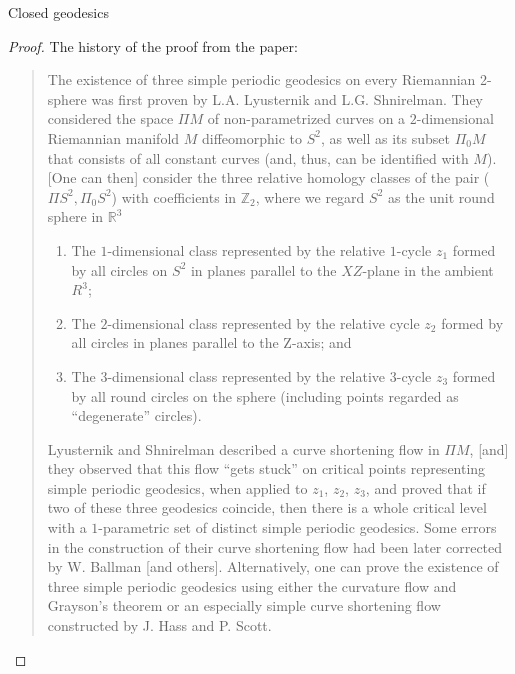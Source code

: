 \documentclass{article}
\theoremstyle{definition}
\theoremstyle{remark}
\begin{document}
\begin{section}{Closed geodesics}
  \begin{proof}
    The history of the proof from the \cite{Liokumovich} paper:
    \begin{quote}
      The existence of three simple periodic geodesics on every Riemannian 2-sphere
      was first proven by L.A. Lyusternik and L.G. Shnirelman. They considered
      the space $\Pi M$ of non-parametrized curves on a $2$-dimensional
      Riemannian manifold $M$ diffeomorphic to $S^2$, as well as its subset
      $\Pi_0M$ that consists of all constant curves (and, thus, can be
      identified with $M$). [One can then] consider the three relative homology
      classes of the pair ($\Pi S^2, \Pi_0S^2$) with coefficients in
      $\mathbb Z_2$, where we regard $S^2$ as the unit round sphere in $\mathbb R^3$
      \begin{enumerate}[1)]
        \item The $1$-dimensional class represented by the relative $1$-cycle $z_1$
        formed by all circles on $S^2$ in planes parallel to the $XZ$-plane in
        the ambient $R^3$;
        \item The $2$-dimensional class represented by the relative cycle $z_2$
        formed by all circles in planes parallel to the Z-axis; and
        \item The $3$-dimensional class represented by the relative $3$-cycle
        $z_3$ formed by all round circles on the sphere (including points regarded
        as “degenerate” circles).
      \end{enumerate}

      Lyusternik and Shnirelman described a curve shortening flow in $\Pi M$, [and]
      they observed that this flow “gets stuck” on critical points representing simple periodic
      geodesics, when applied to $z_1$, $z_2$, $z_3$, and proved that if two of
      these three geodesics coincide, then there is a whole critical level with
      a $1$-parametric set of distinct simple periodic geodesics. Some errors in
      the construction of their curve shortening flow had been later corrected
      by W. Ballman [and others]. Alternatively, one
      can prove the existence of three simple periodic geodesics using either the curvature flow
      and Grayson’s theorem or an especially simple curve shortening flow constructed
      by J. Hass and P. Scott.
    \end{quote}
  \end{proof}


\end{section}
\end{document}
